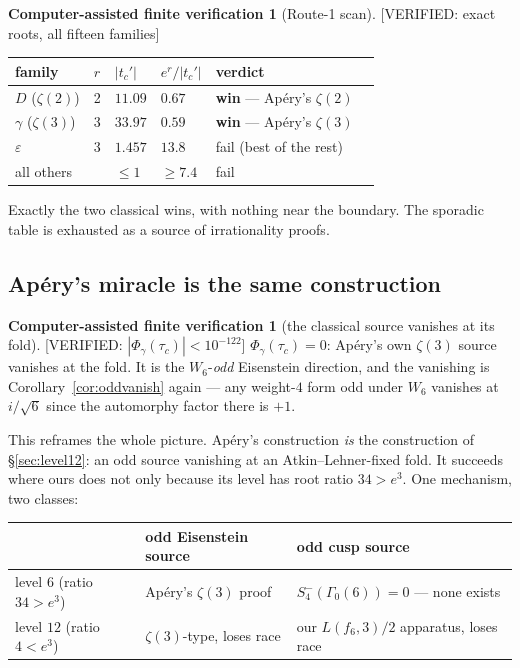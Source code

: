 \documentclass[11pt,reqno]{amsart}
\theoremstyle{plain}
\theoremstyle{definition}
\newtheorem{verification}[theorem]{Computer-assisted finite verification}
\theoremstyle{remark}
\newcommand{\VerifiedR}[1]{\textup{\textsf{[VERIFIED: #1]}}}
\begin{document}
\begin{verification}[Route-1 scan]\label{ver:race}
\VerifiedR{exact roots, all fifteen families}
\begin{center}
\begin{tabular}{@{}llllll@{}}
\toprule
family & $r$ & $|t_c'|$ & $e^{r}/|t_c'|$ & verdict \\
\midrule
$D$ ($\zeta(2)$)      & 2 & $11.09$ & $0.67$ & \textbf{win} --- Ap\'ery's $\zeta(2)$ \\
$\gamma$ ($\zeta(3)$) & 3 & $33.97$ & $0.59$ & \textbf{win} --- Ap\'ery's $\zeta(3)$ \\
$\varepsilon$         & 3 & $1.457$ & $13.8$ & fail (best of the rest) \\
all others            &   & $\le1$  & $\ge7.4$ & fail \\
\bottomrule
\end{tabular}
\end{center}
\end{verification}

Exactly the two classical wins, with nothing near the boundary. The
sporadic table is exhausted as a source of irrationality proofs.

\subsection{Ap\'ery's miracle is the same construction}
\begin{verification}[the classical source vanishes at its fold]\label{ver:phigamma}
\VerifiedR{$|\Phi_\gamma(\tau_c)|<10^{-122}$}
$\Phi_\gamma(\tau_c)=0$: Ap\'ery's own $\zeta(3)$ source vanishes at the
fold. It is the $W_6$-\emph{odd} Eisenstein direction, and the vanishing is
Corollary~\ref{cor:oddvanish} again --- any weight-$4$ form odd under
$W_6$ vanishes at $i/\sqrt6$ since the automorphy factor there is $+1$.
\end{verification}

This reframes the whole picture. Ap\'ery's construction \emph{is} the
construction of \S\ref{sec:level12}: an odd source vanishing at an
Atkin--Lehner-fixed fold. It succeeds where ours does not only because its
level has root ratio $34>e^3$. One mechanism, two classes:

\begin{center}
\begin{tabular}{@{}lll@{}}
\toprule
& odd Eisenstein source & odd cusp source \\
\midrule
level $6$ (ratio $34>e^3$) & Ap\'ery's $\zeta(3)$ proof &
$S_4^-(\Gamma_0(6))=0$ --- none exists \\
level $12$ (ratio $4<e^3$) & $\zeta(3)$-type, loses race &
our $L(f_6,3)/2$ apparatus, loses race \\
\bottomrule
\end{tabular}
\end{center}
\end{document}

